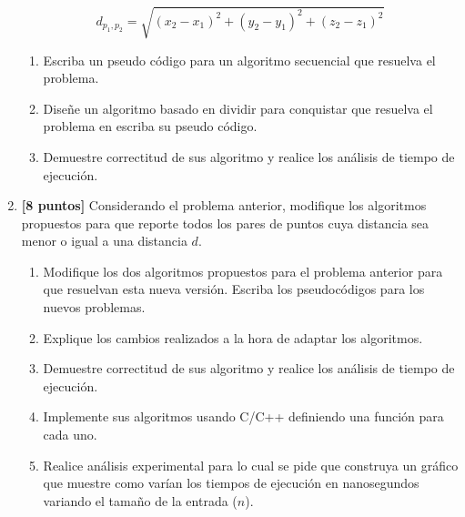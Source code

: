 \documentclass[10pt]{article}
\begin{document}
\begin{enumerate}
\begin{equation*}
    d_{p_1,p_2} = \sqrt{(x_2-x_1)^2+(y_2-y_1)^2+(z_2-z_1)^2}
\end{equation*}

\begin{enumerate}
    \item Escriba un pseudo código para un algoritmo secuencial que resuelva el problema.
    \item Diseñe un algoritmo basado en dividir para conquistar que resuelva el problema en escriba su pseudo código.
    \item Demuestre correctitud de sus algoritmo y realice los análisis de tiempo de ejecución.
\end{enumerate}


\item \textbf{[8 puntos]} Considerando el problema anterior, modifique los algoritmos propuestos para que reporte todos los pares de puntos cuya distancia sea menor o igual a una distancia $d$.

\begin{enumerate}
    \item Modifique los dos algoritmos propuestos para el problema anterior para que resuelvan esta nueva versión. Escriba los pseudocódigos para los nuevos problemas.
    \item Explique los cambios realizados a la hora de adaptar los algoritmos.
    \item Demuestre correctitud de sus algoritmo y realice los análisis de tiempo de ejecución.
    \item Implemente sus algoritmos usando C/C++ definiendo una función para cada uno.
    \item Realice análisis experimental para lo cual se pide que construya un gráfico que muestre como varían los tiempos de ejecución en nanosegundos variando el tamaño de la entrada ($n$).
\end{enumerate}





\end{enumerate}
\end{document}
